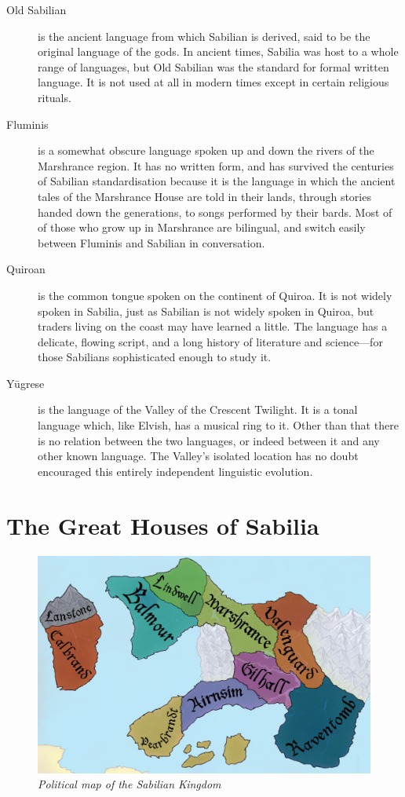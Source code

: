 \documentclass[10pt,twoside,openright,a4paper,twocolumn]{book}
\begin{document}
\begin{description}
    \item [Old Sabilian] is the ancient language from which Sabilian is derived,
said to be the original language of the gods.  In ancient times, Sabilia was host
to a whole range of languages, but Old Sabilian was the standard for formal
written language.  It is not used at all in modern times except in certain religious
rituals.
    \item [Fluminis] is a somewhat obscure language spoken up and down the
rivers of the Marshrance region.  It has no written form, and has survived the
centuries of Sabilian standardisation because it is the language in which the
ancient tales of the Marshrance House are told in their lands, through stories
handed down the generations, to songs performed by their bards.  Most of
of those who grow up in Marshrance are bilingual, and switch easily between
Fluminis and Sabilian in conversation.
    \item [Quiroan] is the common tongue spoken on the continent of Quiroa.
It is not widely spoken in Sabilia, just as Sabilian is not widely spoken in Quiroa,
but traders living on the coast may have learned a little.  The language has a delicate,
flowing script, and a long history of literature and science---for those Sabilians
sophisticated enough to study it.
    \item [Y\=ugrese] is the language of the Valley of the Crescent Twilight.  It
is a tonal language which, like Elvish, has a musical ring to it.  Other than that there
is no relation between the two languages, or indeed between it and any other
known language.  The Valley's isolated location has no doubt encouraged this
entirely independent linguistic evolution.
\end{description}


\chapter{The Great Houses of Sabilia}
\label{chap:houses}

\begin{figure}[ht]
  \includegraphics[width=\textwidth]{images/sabilia-political.png}
  \centering
  \textit{Political map of the Sabilian Kingdom}
\end{figure}
\end{document}
